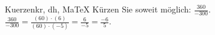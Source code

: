 \begin{MAufgabe}{Kuerzen}{kr, dh, MaTeX}
K\"urzen Sie soweit m\"oglich: $\frac{360}{-300}$.\\ 
\ifLsg\MLoesung
\quad $\frac{360}{-300}=\frac{(60)\cdot(6)}{(60)\cdot(-5)}=\frac{6}{-5}=\frac{-6}{5}$.\else\relax\fi
 \end{MAufgabe}